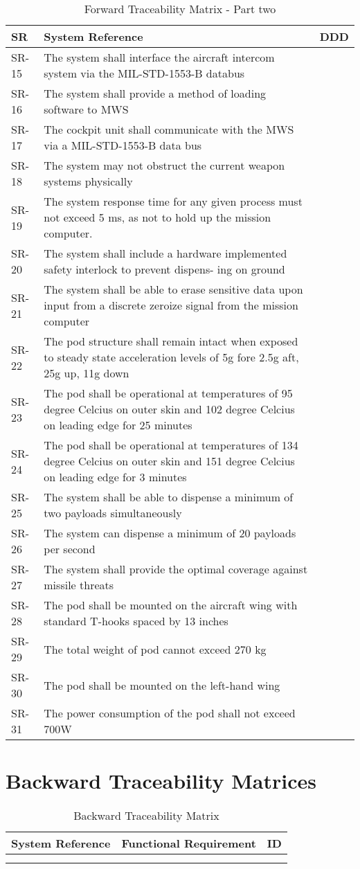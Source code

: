 \documentclass[Main]{subfiles}
\begin{document}
\begin{table}[htbp]
	\centering
	\begin{longtable}{p{} p{} p{}} \hline
	SR & System Reference & DDD \\\hline
	SR-15 & The system shall interface the aircraft intercom system via the MIL-STD-1553-B
	databus &  \\
	SR-16 & The system shall provide a method of loading software to MWS &  \\
	SR-17 & The cockpit unit shall communicate with the MWS via a MIL-STD-1553-B data bus &  \\
	SR-18 & The system may not obstruct the current weapon systems physically &  \\
	SR-19 & The system response time for any given process must not exceed 5 ms, as not to hold up the mission computer. &  \\
	SR-20 & The system shall include a hardware implemented safety interlock to prevent dispens-
	ing on ground &  \\
	SR-21 & The system shall be able to erase sensitive data upon input from a discrete zeroize
	signal from the mission computer &  \\
	SR-22 &  The pod structure shall remain intact when exposed to steady state acceleration levels
	of 5g fore 2.5g aft, 25g up, 11g down &  \\
	SR-23 &  The pod shall be operational at temperatures of 95 degree Celcius on outer skin and
	102 degree Celcius on leading edge for 25 minutes &  \\
	SR-24 &  The pod shall be operational at temperatures of 134 degree Celcius on outer skin and
	151 degree Celcius on leading edge for 3 minutes &  \\
	SR-25 & The system shall be able to dispense a minimum of two payloads simultaneously  &  \\
	SR-26 & The system can dispense a minimum of 20 payloads per second &  \\
	SR-27 & The system shall provide the optimal coverage against	missile threats &  \\
	SR-28 & The pod shall be mounted on the aircraft wing with standard T-hooks spaced by 13
	inches &  \\
	SR-29 & The total weight of pod cannot exceed 270 kg  &  \\
	SR-30 & The pod shall be mounted on the left-hand wing &  \\
	SR-31 & The power consumption of the pod shall not exceed 700W &  \\\hline
	\end{longtable}

\caption{Forward Traceability Matrix - Part two}
\label{Tab:ForwardPartTwo}
\end{table}




\newpage
\section{Backward Traceability Matrices}

\begin{longtable}{l p{10.4cm} p{1.8cm} } \hline
System Reference & Functional Requirement & ID\\\hline


\\\hline
\caption{Backward Traceability Matrix}
\label{Tab:Backward}
\end{longtable}
\end{document}
